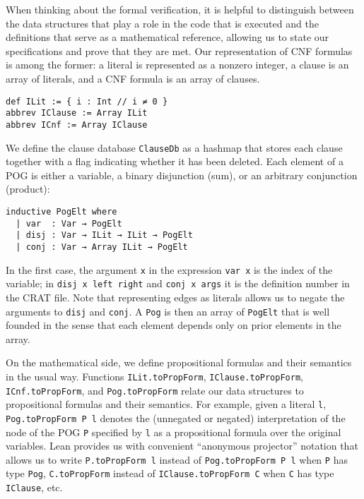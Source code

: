 When thinking about the formal verification, it is helpful to distinguish between
the data structures that play a role in the code that is
executed and the definitions that serve as a mathematical reference,
allowing us to state our specifications and prove that they are met.
Our representation of CNF formulas is among the former:
a literal is represented as a nonzero integer, a clause is an array of literals,
and a CNF formula is an array of clauses.
\begin{lstlisting}
def ILit := { i : Int // i ≠ 0 }
abbrev IClause := Array ILit
abbrev ICnf := Array IClause
\end{lstlisting}
We define the clause database {\tt ClauseDb} as a hashmap that
stores each clause together with a flag indicating whether it has
been deleted.
Each element of a POG is either a variable, a binary disjunction (sum),
or an arbitrary conjunction (product):
\begin{lstlisting}
inductive PogElt where
  | var  : Var → PogElt
  | disj : Var → ILit → ILit → PogElt
  | conj : Var → Array ILit → PogElt
\end{lstlisting}
In the first case, the argument \lstinline{x} in the expression
\lstinline{var x} is the index
of the variable; in \lstinline{disj x left right} and \lstinline{conj x args}
it is the definition number in the CRAT file. Note that representing edges as literals allows us to negate the arguments to \lstinline{disj} and \lstinline{conj}.
A \lstinline{Pog} is then an array of \lstinline{PogElt}
that is well founded in the sense that each element depends only on prior elements
in the array.

On the mathematical side, we define propositional formulas and
their semantics in the usual way.
Functions \lstinline{ILit.toPropForm}, \lstinline{IClause.toPropForm},
\lstinline{ICnf.toPropForm}, and \lstinline{Pog.toPropForm}
relate our data structures to propositional formulas and their semantics.
For example, given a literal \lstinline{l}, \lstinline{Pog.toPropForm P l}
denotes the (unnegated or negated) interpretation of the node of the POG
\lstinline{P} specified by \lstinline{l} as a propositional formula over the
original variables.
Lean provides us with convenient ``anonymous projector'' notation that allows
us to write \lstinline{P.toPropForm l} instead of \lstinline{Pog.toPropForm P l}
when \lstinline{P} has type \lstinline{Pog},
\lstinline{C.toPropForm} instead of \lstinline{IClause.toPropForm C} when \lstinline{C}
has type \lstinline{IClause}, etc.

